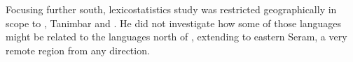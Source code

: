 Focusing further south, \citet{Hughes1987} lexicostatistics study
was restricted geographically in scope to , Tanimbar and .
He did not investigate how some of those languages might be related
to the languages north of ,
extending to eastern Seram,
a very remote region from any direction.